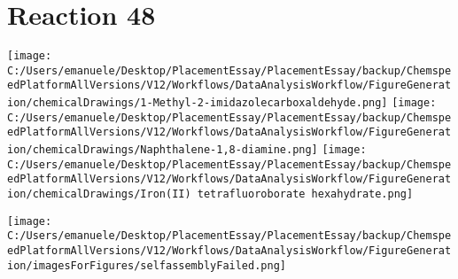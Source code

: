 \documentclass{article}%
\begin{document}
\section*{Reaction 48}%
%
\begin{scheme}[H]%
\begin{minipage}{0.5\textwidth}%
\texttt{[image: C:/Users/emanuele/Desktop/PlacementEssay/PlacementEssay/backup/ChemspeedPlatformAllVersions/V12/Workflows/DataAnalysisWorkflow/FigureGeneration/chemicalDrawings/1-Methyl-2-imidazolecarboxaldehyde.png]}%
\texttt{[image: C:/Users/emanuele/Desktop/PlacementEssay/PlacementEssay/backup/ChemspeedPlatformAllVersions/V12/Workflows/DataAnalysisWorkflow/FigureGeneration/chemicalDrawings/Naphthalene-1,8-diamine.png]}%
\texttt{[image: C:/Users/emanuele/Desktop/PlacementEssay/PlacementEssay/backup/ChemspeedPlatformAllVersions/V12/Workflows/DataAnalysisWorkflow/FigureGeneration/chemicalDrawings/Iron(II) tetrafluoroborate hexahydrate.png]}%
\end{minipage}%
\begin{minipage}{0.5\textwidth}%
\begin{center}%
\texttt{[image: C:/Users/emanuele/Desktop/PlacementEssay/PlacementEssay/backup/ChemspeedPlatformAllVersions/V12/Workflows/DataAnalysisWorkflow/FigureGeneration/imagesForFigures/selfassemblyFailed.png]}%
\end{center}%
\end{minipage}%
\caption{Self-assembly of components 12, 21, with Iron(II) in a 3.0:1.5:1.0 molar ratio in CH$_3$CN at 60\textdegree C for 40h. These are the reagents (starting materials) for reaction 48.}%
\end{scheme}%
\end{document}
